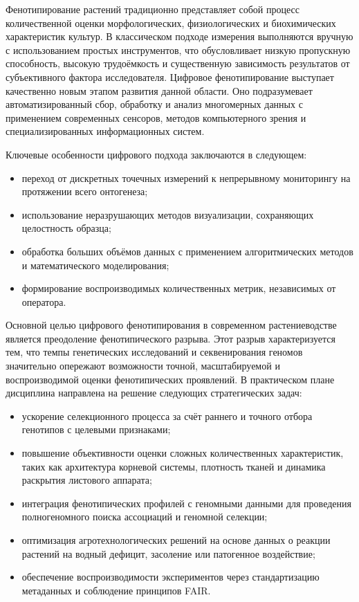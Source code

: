 \documentclass[14pt,a4paper]{extreport}
\begin{document}
Фенотипирование растений традиционно представляет собой процесс количественной оценки морфологических, физиологических и биохимических характеристик культур. В классическом подходе измерения выполняются вручную с использованием простых инструментов, что обусловливает низкую пропускную способность, высокую трудоёмкость и существенную зависимость результатов от субъективного фактора исследователя. Цифровое фенотипирование выступает качественно новым этапом развития данной области. Оно подразумевает автоматизированный сбор, обработку и анализ многомерных данных с применением современных сенсоров, методов компьютерного зрения и специализированных информационных систем.

Ключевые особенности цифрового подхода заключаются в следующем:
\begin{itemize}
  \item переход от дискретных точечных измерений к непрерывному мониторингу на протяжении всего онтогенеза;
  \item использование неразрушающих методов визуализации, сохраняющих целостность образца;
  \item обработка больших объёмов данных с применением алгоритмических методов и математического моделирования;
  \item формирование воспроизводимых количественных метрик, независимых от оператора.
\end{itemize}

Основной целью цифрового фенотипирования в современном растениеводстве является преодоление фенотипического разрыва. Этот разрыв характеризуется тем, что темпы генетических исследований и секвенирования геномов значительно опережают возможности точной, масштабируемой и воспроизводимой оценки фенотипических проявлений. В практическом плане дисциплина направлена на решение следующих стратегических задач:
\begin{itemize}
  \item ускорение селекционного процесса за счёт раннего и точного отбора генотипов с целевыми признаками;
  \item повышение объективности оценки сложных количественных характеристик, таких как архитектура корневой системы, плотность тканей и динамика раскрытия листового аппарата;
  \item интеграция фенотипических профилей с геномными данными для проведения полногеномного поиска ассоциаций и геномной селекции;
  \item оптимизация агротехнологических решений на основе данных о реакции растений на водный дефицит, засоление или патогенное воздействие;
  \item обеспечение воспроизводимости экспериментов через стандартизацию метаданных и соблюдение принципов FAIR.
\end{itemize}
\end{document}
